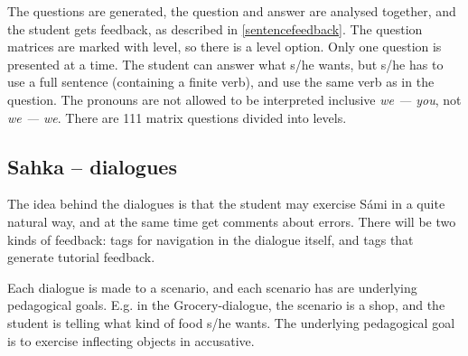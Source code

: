 \documentclass[11pt]{article}
\begin{document}
The questions are generated, the question and answer are analysed together, and the student gets feedback, as described in \ref{sentencefeedback}. The question matrices are marked with level, so there is a level option. Only one question is presented at a time. The student can answer what s/he wants, but s/he has to use a full sentence (containing a finite verb), and use the same verb as in the question. The pronouns are not allowed to be interpreted inclusive \textit{we — you}, not \textit{we — we}. There are 111 matrix questions divided into levels.



	

\subsection{Sahka -- dialogues}
The idea behind the dialogues is that the student may exercise Sámi in a quite natural way, and at the same time get comments about errors. There will be two kinds of feedback: tags for navigation in the dialogue itself, and tags that generate tutorial feedback.

Each dialogue is made to a scenario, and each scenario has are underlying pedagogical goals. E.g. in the Grocery-dialogue, the scenario is a shop, and the student is telling what kind of food s/he wants. The underlying pedagogical goal is to exercise inflecting objects in accusative.
\end{document}
